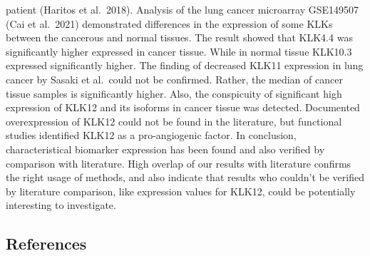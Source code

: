 \documentclass[
]{article}
\begin{document}
patient (Haritos et al.~2018). Analysis of the lung cancer microarray
GSE149507 (Cai et al.~2021) demonstrated differences in the expression
of some KLKs between the cancerous and normal tissues. The result showed
that KLK4.4 was significantly higher expressed in cancer tissue. While
in normal tissue KLK10.3 expressed significantly higher. The finding of
decreased KLK11 expression in lung cancer by Sasaki et al.~could not be
confirmed. Rather, the median of cancer tissue samples is significantly
higher. Also, the conspicuity of significant high expression of KLK12
and its isoforms in cancer tissue was detected. Documented
overexpression of KLK12 could not be found in the literature, but
functional studies identified KLK12 as a pro-angiogenic factor. In
conclusion, characteristical biomarker expression has been found and
also verified by comparison with literature. High overlap of our results
with literature confirms the right usage of methods, and also indicate
that results who couldn't be verified by literature comparison, like
expression values for KLK12, could be potentially interesting to
investigate.

\hypertarget{references}{%
\subsection{References}\label{references}}
\end{document}
